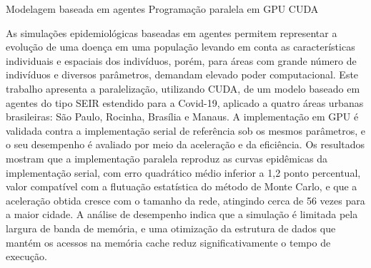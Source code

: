 {Modelagem baseada em agentes}
{Programação paralela em GPU}
{CUDA}




\noindent
As simulações epidemiológicas baseadas em agentes permitem representar a evolução de uma doença em uma população levando em conta as características individuais e espaciais dos indivíduos, porém, para áreas com grande número de indivíduos e diversos parâmetros, demandam elevado poder computacional. Este trabalho apresenta a paralelização, utilizando CUDA, de um modelo baseado em agentes do tipo SEIR estendido para a Covid-19, aplicado a quatro áreas urbanas brasileiras: São Paulo, Rocinha, Brasília e Manaus. A implementação em GPU é validada contra a implementação serial de referência sob os mesmos parâmetros, e o seu desempenho é avaliado por meio da aceleração e da eficiência. Os resultados mostram que a implementação paralela reproduz as curvas epidêmicas da implementação serial, com erro quadrático médio inferior a 1,2 ponto percentual, valor compatível com a flutuação estatística do método de Monte Carlo, e que a aceleração obtida cresce com o tamanho da rede, atingindo cerca de 56 vezes para a maior cidade. A análise de desempenho indica que a simulação é limitada pela largura de banda de memória, e uma otimização da estrutura de dados que mantém os acessos na memória cache reduz significativamente o tempo de execução.

\imprimirchaves %
